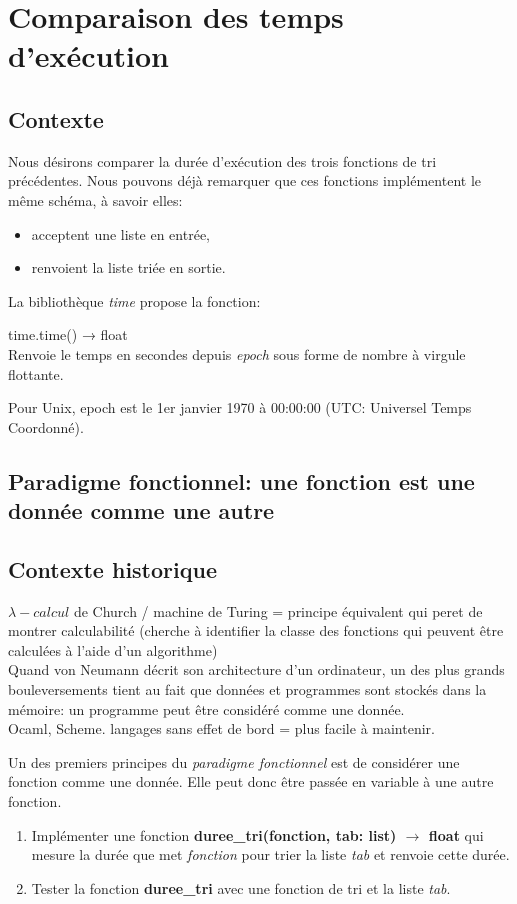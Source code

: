 \documentclass[a4paper,11pt]{article}
\begin{document}
\begin{Form}
\section{Comparaison des temps d'exécution}
\subsection{Contexte}
Nous désirons comparer la durée d'exécution des trois fonctions de tri précédentes. Nous pouvons déjà remarquer que ces fonctions implémentent le même schéma, à savoir elles:
\begin{itemize}
\item acceptent une liste en entrée,
\item renvoient la liste triée en sortie.
\end{itemize}
\medskip
La bibliothèque \emph{time} propose la fonction:
\begin{framed}
time.time() → float
\\Renvoie le temps en secondes depuis \emph{epoch} sous forme de nombre à virgule flottante. 
\end{framed}
\begin{commentprof}
Pour Unix, epoch est le 1er janvier 1970 à 00:00:00 (UTC: Universel Temps Coordonné). 
\end{commentprof}
\subsection{Paradigme fonctionnel: une fonction est une donnée comme une autre}
\begin{commentprof}
\section*{Contexte historique}
$\lambda-calcul$ de Church / machine de Turing = principe équivalent qui peret de montrer calculabilité (cherche à identifier la classe des fonctions qui peuvent être calculées à l'aide d'un algorithme)\\
Quand von Neumann décrit son architecture d'un ordinateur, un des plus grands bouleversements tient au fait que données et programmes sont stockés dans la mémoire: un programme peut être considéré comme une donnée.\\
Ocaml, Scheme. langages sans effet de bord = plus facile à maintenir.
\end{commentprof}
Un des premiers principes du \emph{paradigme fonctionnel} est de considérer une fonction comme une donnée. Elle peut donc être passée en variable à une autre fonction.
\begin{activite}
\begin{enumerate}
\item Implémenter une fonction \textbf{duree\_tri(fonction, tab: list) $\rightarrow$ float} qui mesure la durée que met \emph{fonction} pour trier la liste \emph{tab} et renvoie cette durée.
\item Tester la fonction \textbf{duree\_tri} avec une fonction de tri et la liste \emph{tab}. 
\end{enumerate}
\end{activite}

\end{Form}
\end{document}
